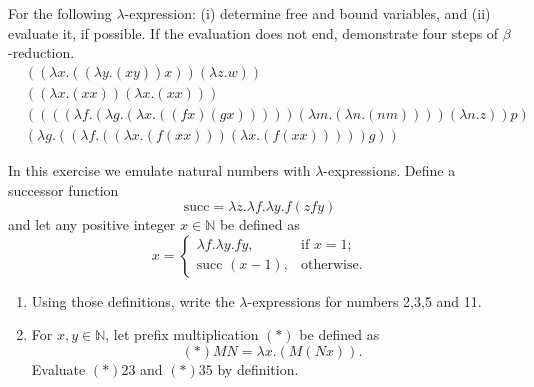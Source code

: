 \begin{ex}
For the following $\lambda$-expression: (i) determine free and bound variables, and (ii) evaluate it, if possible. If the evaluation does not end, demonstrate four steps of $\beta$-reduction. 
    \begin{align*}
        &((\lambda x.((\lambda y.(x y))x))(\lambda z.w))\\
        &((\lambda x.(x x))(\lambda x.(x x)))\\
        &((((\lambda f.(\lambda g.(\lambda x.((fx)(g x)))))(\lambda m.(\lambda n.(n m))))(\lambda n.z))p)\\
        &(\lambda g.((\lambda f.((\lambda x.(f (x x)))(\lambda x.(f (x x))))) g))
    \end{align*}
    \end{ex}
    \begin{ex}
    In this exercise we emulate natural numbers with $\lambda$-expressions. 
    Define a successor function
    $$
    \text{succ}=\lambda z.\lambda f.\lambda y.f(zfy)
    $$
    and let any  positive integer $x\in \mathbb N$ be defined as
    $$
    x=\begin{cases}
\lambda f.\lambda y.fy, & \text{if }x=1;\\
\text{succ }(x-1), & \text{otherwise}.
\end{cases}
    $$
    \begin{enumerate}
        \item Using those definitions, write the $\lambda$-expressions for numbers 2,3,5 and 11.
        \item For $x,y\in \mathbb N$, let prefix multiplication $(*)$ be defined as
        $$(*)MN=\lambda x.(M(Nx)).$$
        Evaluate $(*)23$ and $(*)35$ by definition.
    \end{enumerate}
\end{ex}    


